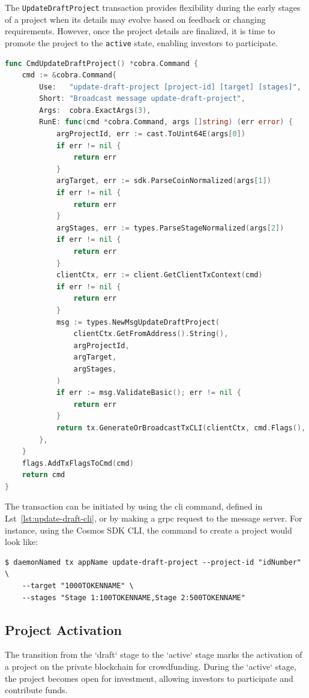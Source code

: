 The \texttt{UpdateDraftProject} transaction provides flexibility during the early stages of a project when its details may evolve based on feedback or changing requirements. However, once the project details are finalized, it is time to promote the project to the \texttt{active} state, enabling investors to participate.

\begin{lstlisting}[language=go, caption=Create Project CLI  definition,label={lst:update-draft-cli}]
func CmdUpdateDraftProject() *cobra.Command {
	cmd := &cobra.Command{
		Use:   "update-draft-project [project-id] [target] [stages]",
		Short: "Broadcast message update-draft-project",
		Args:  cobra.ExactArgs(3),
		RunE: func(cmd *cobra.Command, args []string) (err error) {
			argProjectId, err := cast.ToUint64E(args[0])
			if err != nil {
				return err
			}
			argTarget, err := sdk.ParseCoinNormalized(args[1])
			if err != nil {
				return err
			}
			argStages, err := types.ParseStageNormalized(args[2])
			if err != nil {
				return err
			}
			clientCtx, err := client.GetClientTxContext(cmd)
			if err != nil {
				return err
			}
			msg := types.NewMsgUpdateDraftProject(
				clientCtx.GetFromAddress().String(),
				argProjectId,
				argTarget,
				argStages,
			)
			if err := msg.ValidateBasic(); err != nil {
				return err
			}
			return tx.GenerateOrBroadcastTxCLI(clientCtx, cmd.Flags(), msg)
		},
	}
	flags.AddTxFlagsToCmd(cmd)
	return cmd
}
\end{lstlisting}

The transaction can be initiated by using the \gls{cli} command, defined in Lst~\ref{lst:update-draft-cli},  or by making a \gls{grpc} request to the message server. For instance, using the Cosmos SDK CLI, the command to create a project would look like:


\begin{verbatim}
$ daemonNamed tx appName update-draft-project --project-id "idNumber" \
    --target "1000TOKENNAME" \
    --stages "Stage 1:100TOKENNAME,Stage 2:500TOKENNAME"
\end{verbatim}

\subsection{Project Activation}

The transition from the `draft` stage to the `active` stage marks the activation of a project on the private blockchain for crowdfunding. During the `active` stage, the project becomes open for investment, allowing investors to participate and contribute funds.

